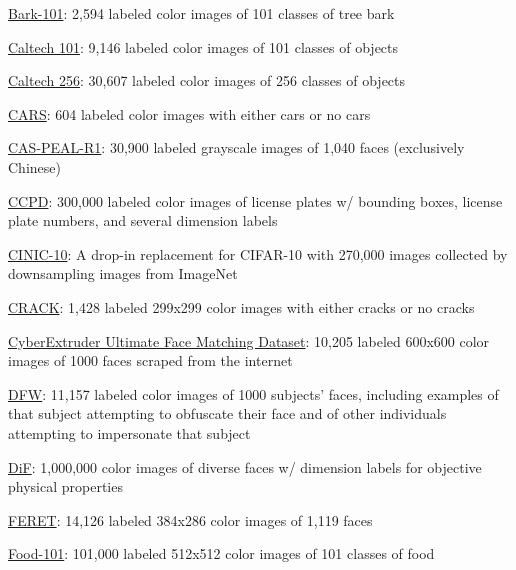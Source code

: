 \documentclass{tufte-handout}
\begin{document}
\bi
\item
  \href{http://eidolon.univ-lyon2.fr/~remi1/Bark-101/}{Bark-101}: 2,594
  labeled color images of 101 classes of tree bark
\item
  \href{http://www.vision.caltech.edu/Image_Datasets/Caltech101/}{Caltech
  101}: 9,146 labeled color images of 101 classes of objects
\item
  \href{http://www.vision.caltech.edu/Image_Datasets/Caltech256/}{Caltech
  256}: 30,607 labeled color images of 256 classes of objects
\item
  \href{https://dataturks.com/projects/dominique.paul.info/cars2}{CARS}:
  604 labeled color images with either cars or no cars
\item
  \href{http://www.jdl.ac.cn/peal/index.html}{CAS-PEAL-R1}: 30,900
  labeled grayscale images of 1,040 faces (exclusively Chinese)
\item
  \href{https://github.com/detectRecog/CCPD}{CCPD}: 300,000 labeled
  color images of license plates w/ bounding boxes, license plate
  numbers, and several dimension labels
\item
  \href{https://github.com/BayesWatch/cinic-10}{CINIC-10}: A drop-in
  replacement for CIFAR-10 with 270,000 images collected by downsampling
  images from ImageNet
\item
  \href{https://dataturks.com/projects/miaozh17/Crack\%20Classification}{CRACK}:
  1,428 labeled 299x299 color images with either cracks or no cracks
\item
  \href{https://cyberextruder.com/face-matching-data-set-download/}{CyberExtruder
  Ultimate Face Matching Dataset}: 10,205 labeled 600x600 color images
  of 1000 faces scraped from the internet
\item
  \href{http://iab-rubric.org/resources/dfw.html}{DFW}: 11,157 labeled
  color images of 1000 subjects' faces, including examples of that
  subject attempting to obfuscate their face and of other individuals
  attempting to impersonate that subject
\item
  \href{https://www.research.ibm.com/artificial-intelligence/trusted-ai/diversity-in-faces}{DiF}:
  1,000,000 color images of diverse faces w/ dimension labels for
  objective physical properties
\item
  \href{https://www.nist.gov/itl/iad/image-group/color-feret-database}{FERET}:
  14,126 labeled 384x286 color images of 1,119 faces
\item
  \href{https://www.vision.ee.ethz.ch/datasets_extra/food-101/}{Food-101}:
  101,000 labeled 512x512 color images of 101 classes of food
\end{document}
